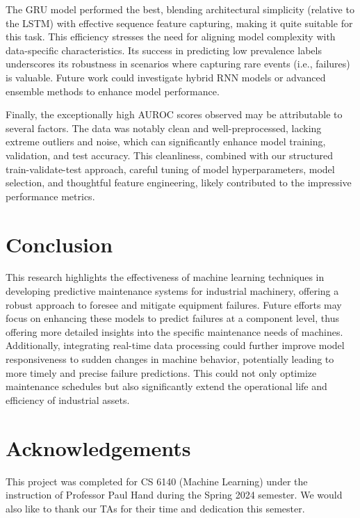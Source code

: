 \documentclass{article}
\begin{document}
The GRU model performed the best, blending architectural simplicity (relative to the LSTM) with effective sequence feature capturing, making it quite suitable for this task. This efficiency stresses the need for aligning model complexity with data-specific characteristics. Its success in predicting low prevalence labels underscores its robustness in scenarios where capturing rare events (i.e., failures) is valuable. Future work could investigate hybrid RNN models or advanced ensemble methods to enhance model performance.

Finally, the exceptionally high AUROC scores observed may be attributable to several factors. The data was notably clean and well-preprocessed, lacking extreme outliers and noise, which can significantly enhance model training, validation, and test accuracy. This cleanliness, combined with our structured train-validate-test approach, careful tuning of model hyperparameters, model selection, and thoughtful feature engineering, likely contributed to the impressive performance metrics.

\section{Conclusion}
\label{conclusion}

This research highlights the effectiveness of machine learning techniques in developing predictive maintenance systems for industrial machinery, offering a robust approach to foresee and mitigate equipment failures. Future efforts may focus on enhancing these models to predict failures at a component level, thus offering more detailed insights into the specific maintenance needs of machines. Additionally, integrating real-time data processing could further improve model responsiveness to sudden changes in machine behavior, potentially leading to more timely and precise failure predictions. This could not only optimize maintenance schedules but also significantly extend the operational life and efficiency of industrial assets.

\section{Acknowledgements}
\label{acknowledgements}

This project was completed for CS 6140 (Machine Learning) under the instruction of Professor Paul Hand during the Spring 2024 semester. We would also like to thank our TAs for their time and dedication this semester.
\end{document}
